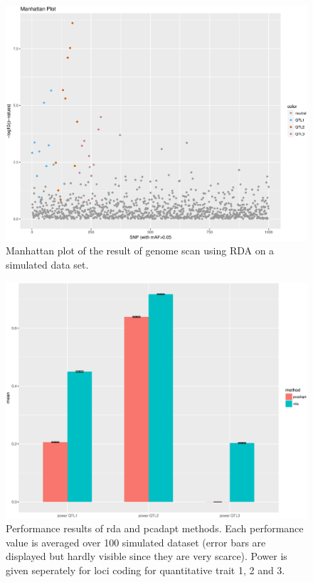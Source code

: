 \documentclass[nogrid]{MBE}%
\begin{document}
\begin{figure}[t]
\begin{center}
\includegraphics[height=0.21\textheight]{figures/sim105_capscale.eps}
\end{center}
\caption{Manhattan plot of the result of genome scan using RDA on a simulated data set.}%
\label{fig:rda}%
\end{figure}


\begin{figure}[t]
\begin{center}
\includegraphics[height=0.4\textheight]{figures/overallresults.eps}
\end{center}
\caption{Performance results of rda and pcadapt methods. Each performance value is averaged over 100 simulated dataset (error bars are displayed but hardly visible since they are very scarce). Power is given seperately for loci coding for quantitative trait 1, 2 and 3.}%
\label{fig:performance}%
\end{figure}
\end{document}
